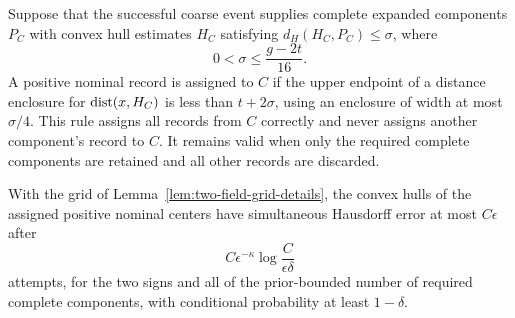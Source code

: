 \begin{lemma}
\label{lem:two-field-assignment-details}
Suppose that the successful coarse event supplies complete expanded
components $P_C$ with convex hull estimates $H_C$ satisfying
$d_H(H_C,P_C)\le\sigma$, where
\[
            0<\sigma\le\frac{g-2t}{16}.
\]
A positive nominal record is assigned to $C$ if the upper endpoint
of a distance enclosure for $\operatorname{dist}(x,H_C)$ is less than
$t+2\sigma$, using an enclosure of width at most $\sigma/4$.
This rule assigns all
records from $C$ correctly and never assigns another component's
record to $C$.  It remains valid when only the required complete
components are retained and all other records are discarded.

With the grid of Lemma~\ref{lem:two-field-grid-details}, the convex
hulls of the assigned positive nominal centers have simultaneous
Hausdorff error at most $C\epsilon$ after
\[
       C\epsilon^{-\kappa}\log\frac C{\epsilon\delta}
\]
attempts, for the two signs and all of the prior-bounded number of
required complete components, with conditional probability at least
$1-\delta$.
\end{lemma}
